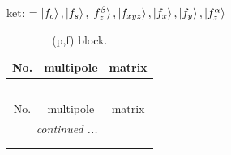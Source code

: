 \documentclass[fleqn,8pt,landscape]{jsarticle}
\begin{document}
\noindent
ket: $=\ket{f_{c}}, \ket{f_{s}}, \ket{f_{z}^{\beta}}, \ket{f_{xyz}}, \ket{f_{x}}, \ket{f_{y}}, \ket{f_{z}^{\alpha}}$
\renewcommand{\arraystretch}{1.6}
\begin{longtable}{ccc}
\caption{(p,f) block.}
 \\
 \hline \hline
No. & multipole & matrix \\ \hline \endfirsthead

\multicolumn{2}{l}{\tablename\ \thetable{}} \\
 \hline \hline
No. & multipole & matrix \\ \hline \endhead

 \hline \hline
\multicolumn{2}{r}{\footnotesize\it continued ...} \\ \endfoot

 \hline \hline
\multicolumn{2}{r}{} \\ \endlastfoot


\end{longtable}
\end{document}
